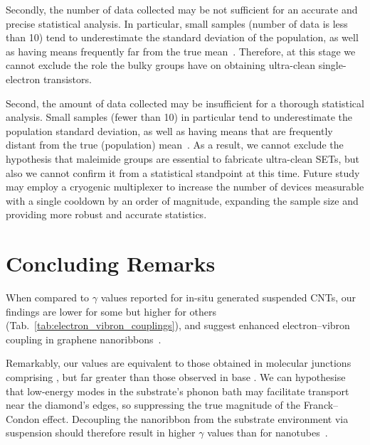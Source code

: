 Secondly, the number of data collected may be not sufficient for an accurate and precise statistical analysis. In particular, small samples (number of data is less than 10) tend to underestimate the standard deviation of the population, as well as having means frequently far from the true mean~\cite{reus2012statistical, reuter2012signatures}. Therefore, at this stage we cannot exclude the role the bulky groups have on obtaining ultra-clean single-electron transistors.

Second, the amount of data collected may be insufficient for a thorough statistical analysis. Small samples (fewer than 10) in particular tend to underestimate the population standard deviation, as well as having means that are frequently distant from the true (population) mean~\cite{reus2012statistical, reuter2012signatures}. As a result, we cannot exclude the hypothesis that maleimide groups are essential to fabricate ultra-clean \glspl{SET}, but also we cannot confirm it from a statistical standpoint at this time. Future study may employ a cryogenic multiplexer to increase the number of devices measurable with a single cooldown by an order of magnitude, expanding the sample size and providing more robust and accurate statistics.

\section{Concluding Remarks}\label{solubility:sec:summary}

When compared to $\gamma$ values reported for in-situ generated suspended \glspl{CNT}, our findings are lower for some but higher for others (Tab.~\ref{tab:electron_vibron_couplings}), and suggest enhanced electron--vibron coupling in graphene nanoribbons~\cite{zhou2019electron}.

Remarkably, our values are equivalent to those obtained in molecular junctions comprising , but far greater than those observed in base . We can hypothesise that low-energy modes in the substrate's phonon bath may facilitate transport near the diamond's edges, so suppressing the true magnitude of the Franck--Condon effect. Decoupling the nanoribbon from the substrate environment via suspension should therefore result in higher $\gamma$ values than for nanotubes~\cite{sapmaz2006tunneling}.

